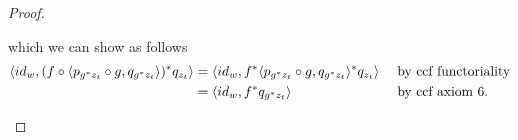 \begin{proof}
\begin{enumerate}[(i)]
which we can show as follows
\begin{align*}
\langle id_w,(f \circ \langle p_{g^*z_t} \circ g, q_{g^*z_t}\rangle )^* q_{z_t}\rangle
    &= \langle id_w,f ^* \langle p_{g^*z_t} \circ g, q_{g^*z_t}\rangle ^* q_{z_t}\rangle &&\mbox{ by ccf functoriality}\\
		&= \langle id_w,f ^*  q_{g^*z_t}\rangle  &&\mbox{ by ccf axiom 6.}\\
\end{align*}

\end{enumerate}
\end{proof}





